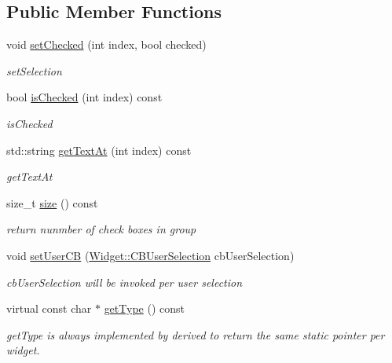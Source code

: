 \subsection*{Public Member Functions}
\begin{DoxyCompactItemize}
\item 
void \hyperlink{classcanvascv_1_1CheckBoxes_ae5614e44017cd8e7169448a9ea3269ec}{set\+Checked} (int index, bool checked)
\begin{DoxyCompactList}\small\item\em set\+Selection \end{DoxyCompactList}\item 
bool \hyperlink{classcanvascv_1_1CheckBoxes_a2e544c7f81248c6b297460be5852506e}{is\+Checked} (int index) const 
\begin{DoxyCompactList}\small\item\em is\+Checked \end{DoxyCompactList}\item 
std\+::string \hyperlink{classcanvascv_1_1CheckBoxes_a1ca004ddd840090415924b1f79b2ee47}{get\+Text\+At} (int index) const 
\begin{DoxyCompactList}\small\item\em get\+Text\+At \end{DoxyCompactList}\item 
size\+\_\+t \hyperlink{classcanvascv_1_1CheckBoxes_ac2e93b64ec078504230c7330d068248c}{size} () const \hypertarget{classcanvascv_1_1CheckBoxes_ac2e93b64ec078504230c7330d068248c}{}\label{classcanvascv_1_1CheckBoxes_ac2e93b64ec078504230c7330d068248c}

\begin{DoxyCompactList}\small\item\em return nunmber of check boxes in group \end{DoxyCompactList}\item 
void \hyperlink{classcanvascv_1_1CheckBoxes_a940fd899b9d206d4d2fc41b309bd0423}{set\+User\+CB} (\hyperlink{classcanvascv_1_1Widget_a977cbd39cf203c5866f07f3645c7e4bc}{Widget\+::\+C\+B\+User\+Selection} cb\+User\+Selection)\hypertarget{classcanvascv_1_1CheckBoxes_a940fd899b9d206d4d2fc41b309bd0423}{}\label{classcanvascv_1_1CheckBoxes_a940fd899b9d206d4d2fc41b309bd0423}

\begin{DoxyCompactList}\small\item\em cb\+User\+Selection will be invoked per user selection \end{DoxyCompactList}\item 
virtual const char $\ast$ \hyperlink{classcanvascv_1_1CheckBoxes_a59d8af71b4304f97f9caa178d38c99be}{get\+Type} () const 
\begin{DoxyCompactList}\small\item\em get\+Type is always implemented by derived to return the same static pointer per widget. \end{DoxyCompactList}\end{DoxyCompactItemize}
